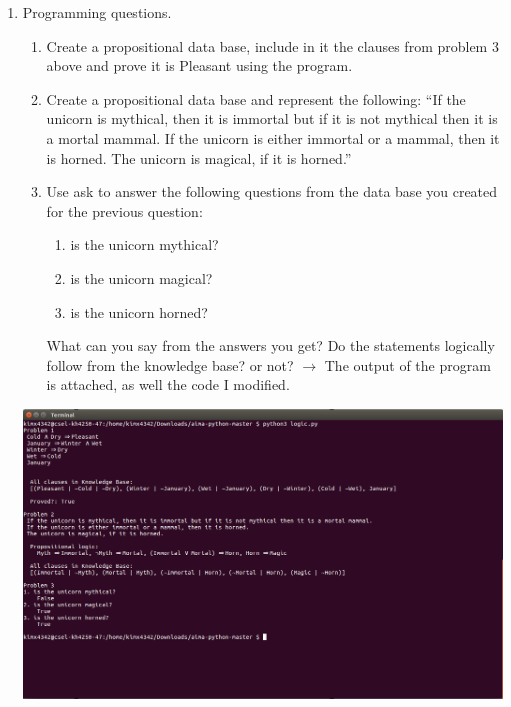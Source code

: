 \documentclass[10pt]{article}
\begin{document}
\begin{enumerate}
\item Programming questions.
	\begin{enumerate}
		\item Create a propositional data base, include in it the clauses from problem 3 above and prove it is Pleasant using the program.
        \item Create a propositional data base and represent the following: \enquote{If the unicorn is mythical, then it is immortal but if it is not mythical then it is a mortal mammal. If the unicorn is either immortal or a mammal, then it is horned. The unicorn is magical, if it is horned.}
        \item Use ask to answer the following questions from the data base you created for the previous question: 
        \begin{enumerate}
        \item is the unicorn mythical?
        \item is the unicorn magical?
        \item is the unicorn horned?
        \end{enumerate}
        What can you say from the answers you get? Do the statements logically follow from the knowledge base? or not? \newline
        $\rightarrow$ The output of the program is attached, as well the code I modified. \newline
	\end{enumerate}
    \includegraphics[width=\textwidth]{hw3_1.png}

\end{enumerate}
\end{document}
